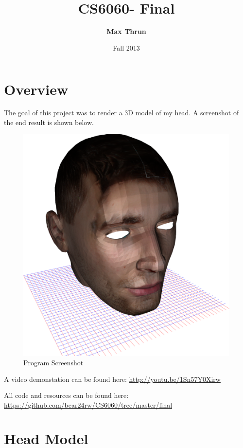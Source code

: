 \documentclass{article}
\date{Fall 2013}
\title{
    \vspace{2in}
    \textmd{\textbf{CS6060- Final}}\\
    \vspace{4in}
}
\author{\textbf{Max Thrun}}
\begin{document}
\maketitle
\newpage

\section*{Overview}

    The goal of this project was to render a 3D model of my head. A screenshot
    of the end result is shown below.

    \begin{figure}[H]
        \centering
        \includegraphics[width=\linewidth]{screenshot}
        \caption{Program Screenshot}
    \end{figure}

    A video demonstation can be found here:
    \url{http://youtu.be/1Sn57Y0Xirw}

    All code and resources can be found here:
    \url{https://github.com/bear24rw/CS6060/tree/master/final}

\newpage
\section*{Head Model}
\end{document}
